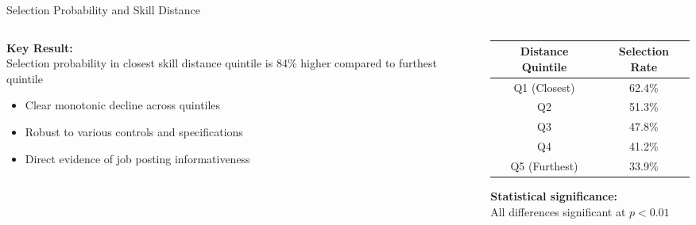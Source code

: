 \documentclass{beamer}
\begin{document}
\begin{frame}{Selection Probability and Skill Distance}
\begin{columns}
\begin{column}{0.45\textwidth}
\begin{tcolorbox}[colback=boxbackground,colframe=boxframe,sharp corners]
\textbf{Key Result:}\\
Selection probability in closest skill distance quintile is 84\% higher compared to furthest quintile
\end{tcolorbox}

\begin{itemize}
    \item Clear monotonic decline across quintiles
    \item Robust to various controls and specifications
    \item Direct evidence of job posting informativeness
\end{itemize}
\end{column}
\begin{column}{0.55\textwidth}
\begin{tabular}{c|c}
\textbf{Distance Quintile} & \textbf{Selection Rate} \\
\hline
Q1 (Closest) & 62.4\% \\
Q2 & 51.3\% \\
Q3 & 47.8\% \\
Q4 & 41.2\% \\
Q5 (Furthest) & 33.9\% \\
\end{tabular}

\vspace{0.5cm}
\begin{tcolorbox}[colback=boxbackground,colframe=boxframe,sharp corners]
\textbf{Statistical significance:}\\
All differences significant at $p < 0.01$
\end{tcolorbox}
\end{column}
\end{columns}
\end{frame}
\end{document}
